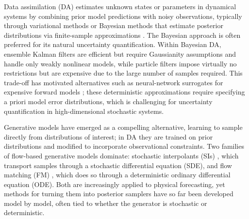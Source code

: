 Data assimilation (DA) estimates unknown states or parameters in dynamical systems by combining prior model predictions with noisy observations, typically through variational methods or Bayesian methods that estimate posterior distributions via finite-sample approximations \cite{evensen_data_2022}. The Bayesian approach is often preferred for its natural uncertainty quantification. Within Bayesian DA, ensemble Kalman filters are efficient but require Gaussianity assumptions and handle only weakly nonlinear models, while particle filters impose virtually no restrictions but are expensive due to the large number of samples required. This trade-off has motivated alternatives such as neural-network surrogates for expensive forward models \cite{mucke_deep_2024, cheng_generalised_2022, zhong_reduced-order_2023, chen_reduced-order_2023}; these deterministic approximations require specifying a priori model error distributions, which is challenging for uncertainty quantification in high-dimensional stochastic systems.

Generative models have emerged as a compelling alternative, learning to sample directly from distributions of interest; in DA they are trained on prior distributions and modified to incorporate observational constraints. Two families of flow-based generative models dominate: stochastic interpolants (SIs) \cite{albergo_stochastic_2023, albergo_building_2023, chen_probabilistic_2024}, which transport samples through a stochastic differential equation (SDE), and flow matching (FM) \cite{lipman_flow_2023}, which does so through a deterministic ordinary differential equation (ODE). Both are increasingly applied to physical forecasting, yet methods for turning them into posterior samplers have so far been developed model by model, often tied to whether the generator is stochastic or deterministic.

